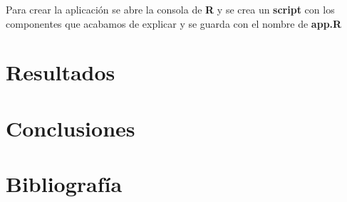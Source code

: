 \documentclass[12pt,letterpaper]{report} %
\begin{document}
Para crear la aplicación se abre la consola de \textbf{R} y se crea un \textbf{script} con los componentes que acabamos de explicar y se guarda con el nombre de \textbf{app.R}

\chapter{Resultados}

\chapter{Conclusiones}

\chapter{Bibliografía}
\end{document}
